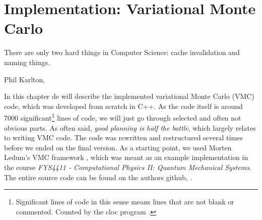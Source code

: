 \chapter{Implementation: Variational Monte Carlo} \label{chp:WFE}
\epigraph{There are only two hard things in Computer Science: cache invalidation and naming things.}{Phil Karlton, \cite{fowler_bliki:_nodate}}

In this chapter de will describe the implemented variational Monte Carlo (VMC) code, which was developed from scratch in C++. As the code itself is around 7000 significant\footnote{Significant lines of code in this sense means lines that are not blank or commented. Counted by the cloc program \cite{aldanial_cloc_2019}.} lines of code, we will just go through selected and often not obvious parts. As often said, \textit{good planning is half the battle}, which largely relates to writing VMC code. The code was rewritten and restructured several times before we ended on the final version. As a starting point, we used Morten Ledum's VMC framework \cite{ledum_simple_2016}, which was meant as an example implementation in the course \textit{FYS4411 - Computational Physics II: Quantum Mechanical Systems}. The entire source code can be found on the authors github, \cite{nordhagen_general_2019}.


